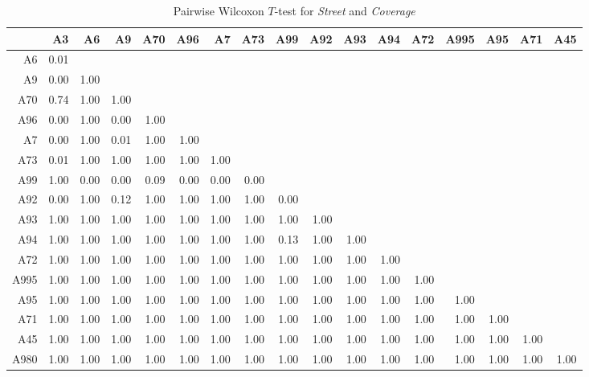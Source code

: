\begin{table}[ht]
	\tiny
	\setlength{\tabcolsep}{4pt}
	\centering
	\begin{tabular}{rrrrrrrrrrrrrrrrr}
	  	\toprule
				& A3   & A6   & A9   & A70  & A96  & A7   & A73 & A99 & A92 & A93 & A94 & A72 & A995 & A95 & A71 & A45 \\ 
	  	\midrule
		A6 		& 0.01 &  &  &  &  &  &  &  &  &  &  &  &  &  &  &  \\ 
	  	A9 		& 0.00 & 1.00 &  &  &  &  &  &  &  &  &  &  &  &  &  &  \\ 
	  	A70 	& 0.74 & 1.00 & 1.00 &  &  &  &  &  &  &  &  &  &  &  &  &  \\ 
	  	A96 	& 0.00 & 1.00 & 0.00 & 1.00 &  &  &  &  &  &  &  &  &  &  &  &  \\ 
	  	A7 		& 0.00 & 1.00 & 0.01 & 1.00 & 1.00 &  &  &  &  &  &  &  &  &  &  &  \\ 
	  	A73 	& 0.01 & 1.00 & 1.00 & 1.00 & 1.00 & 1.00 &  &  &  &  &  &  &  &  &  &  \\ 
	  	A99 	& 1.00 & 0.00 & 0.00 & 0.09 & 0.00 & 0.00 & 0.00 &  &  &  &  &  &  &  &  &  \\ 
	  	A92 	& 0.00 & 1.00 & 0.12 & 1.00 & 1.00 & 1.00 & 1.00 & 0.00 &  &  &  &  &  &  &  &  \\ 
	  	A93 	& 1.00 & 1.00 & 1.00 & 1.00 & 1.00 & 1.00 & 1.00 & 1.00 & 1.00 &  &  &  &  &  &  &  \\ 
	  	A94 	& 1.00 & 1.00 & 1.00 & 1.00 & 1.00 & 1.00 & 1.00 & 0.13 & 1.00 & 1.00 &  &  &  &  &  &  \\ 
	  	A72 	& 1.00 & 1.00 & 1.00 & 1.00 & 1.00 & 1.00 & 1.00 & 1.00 & 1.00 & 1.00 & 1.00 &  &  &  &  &  \\ 
	  	A995 	& 1.00 & 1.00 & 1.00 & 1.00 & 1.00 & 1.00 & 1.00 & 1.00 & 1.00 & 1.00 & 1.00 & 1.00 &  &  &  &  \\ 
	  	A95 	& 1.00 & 1.00 & 1.00 & 1.00 & 1.00 & 1.00 & 1.00 & 1.00 & 1.00 & 1.00 & 1.00 & 1.00 & 1.00 &  &  &  \\ 
	  	A71 	& 1.00 & 1.00 & 1.00 & 1.00 & 1.00 & 1.00 & 1.00 & 1.00 & 1.00 & 1.00 & 1.00 & 1.00 & 1.00 & 1.00 &  &  \\ 
	  	A45 	& 1.00 & 1.00 & 1.00 & 1.00 & 1.00 & 1.00 & 1.00 & 1.00 & 1.00 & 1.00 & 1.00 & 1.00 & 1.00 & 1.00 & 1.00 &  \\ 
	  	A980 	& 1.00 & 1.00 & 1.00 & 1.00 & 1.00 & 1.00 & 1.00 & 1.00 & 1.00 & 1.00 & 1.00 & 1.00 & 1.00 & 1.00 & 1.00 & 1.00 \\ 
	   	\bottomrule
	\end{tabular}
	\caption{Pairwise Wilcoxon $T$-test for \textit{Street} and \textit{Coverage}}
	\label{tbl:wilcoxon_baysis_matched_Strasse_Cov}
\end{table}
